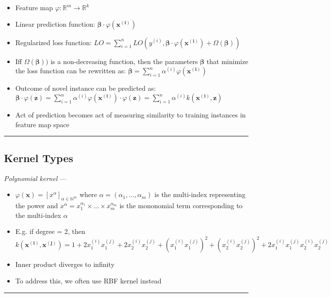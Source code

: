 \begin{itemize}
    \item Feature map $\varphi: \mathbb{R}^m \rightarrow \mathbb{R}^k$
    \item Linear prediction function: $\boldsymbol{\beta} \cdot \varphi(\boldsymbol{x^{(i)}})$
    \item Regularized loss function: $LO = \sum_{i=1}^n LO(y^{(i)}, \boldsymbol{\beta} \cdot \varphi(\boldsymbol{x^{(i)}}) + \Omega( \boldsymbol{\beta} ))$
    \item Iff $\Omega( \boldsymbol{\beta} ))$ is a non-decreasing function, then the parameters $\boldsymbol{\beta}$ that minimize the loss function can be rewritten as: $\boldsymbol{\beta} = \sum_{i=1}^n \alpha^{(i)} \varphi( \boldsymbol{x^{(i)}} )$
    \item Outcome of novel instance can be predicted as: $\boldsymbol{\beta} \cdot \varphi({\boldsymbol{z}}) = \sum_{i=1}^n \alpha^{(i)} \varphi( \boldsymbol{x^{(i)}}) \cdot \varphi({\boldsymbol{z}}) = \sum_{i=1}^n \alpha^{(i)} k(\boldsymbol{x^{(i)}}, \boldsymbol{z})$
    \item Act of prediction becomes act of measuring similarity to training instances in feature map space
\end{itemize}

{\color{black}\hrule height 0.001mm}

\subsection*{Kernel Types}
\emph{Polynomial kernel} ---
\begin{itemize}
    \item $\varphi(\boldsymbol{x}) = [ 
    x^\alpha ]_{\alpha \in \mathbb{N}^m}$ where $\alpha = (\alpha_1, ..., \alpha_m)$ is the multi-index representing the power and $x^\alpha = x_1^{\alpha_1} \times ... \times  x_m^{\alpha_m}$ is the mononomial term corresponding to the multi-index $\alpha$
    \item E.g. if degree = 2, then $k( \boldsymbol{x^{(i)}}, \boldsymbol{x^{(j)}} ) = 1 + 2 x_1^{(i)} x_1^{(j)} + 2 x_2^{(i)} x_2^{(j)} + ( x_1^{(i)} x_1^{(j)} )^2 + ( x_2^{(i)} x_2^{(j)} )^2 + 2 x_1^{(i)} x_1^{(j)} x_2^{(i)} x_2^{(j)}$
    \item Inner product diverges to infinity
    \item To address this, we often use RBF kernel instead
\end{itemize}

{\color{lightgray}\hrule height 0.001mm}

